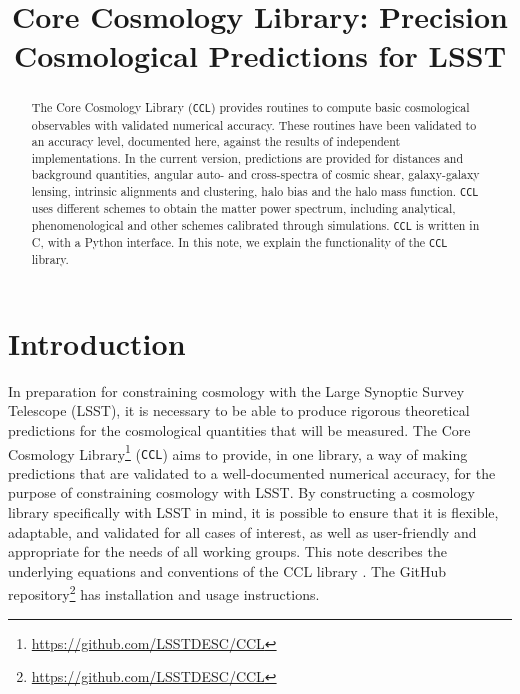 \documentclass[\docopts]{\docclass}
\newcommand{\ccl}{{\tt CCL}\xspace}
\begin{document}
\title{Core Cosmology Library: Precision Cosmological Predictions for LSST}

\maketitlepre

\begin{abstract}

The Core Cosmology Library (\ccl) provides routines to compute basic
cosmological observables with validated numerical accuracy. These routines have
been validated to an accuracy level, documented here, against the results of
independent implementations. In the current version, predictions are provided
for distances and background quantities, angular auto- and cross-spectra of
cosmic shear, galaxy-galaxy lensing, intrinsic alignments and clustering, halo
bias and the halo mass function. \ccl uses different schemes to obtain the
matter power spectrum, including analytical, phenomenological and other schemes
calibrated through simulations. \ccl is written in C, with a Python interface.
In this note, we explain the functionality of the \ccl library.

\end{abstract}


\maketitlepost

\newpage
\tableofcontents{}
\newpage

\section{Introduction}
\label{sec:intro}

In preparation for constraining cosmology with the Large Synoptic Survey
Telescope (LSST), it is necessary to be able to produce rigorous theoretical
predictions for the cosmological quantities that will be measured. The Core
Cosmology Library\footnote{\url{https://github.com/LSSTDESC/CCL}} (\ccl) aims to
provide, in one library, a way of making predictions that are validated to a
well-documented numerical accuracy, for the purpose of constraining cosmology
with LSST. By constructing a cosmology library specifically with LSST in mind,
it is possible to ensure that it is flexible, adaptable, and validated for all
cases of interest, as well as user-friendly and appropriate for the needs of all
working groups. This note describes the underlying equations and conventions
of the CCL library \citep[see also the CCL paper,][]{Chisari2019}.
The GitHub repository\footnote{\url{https://github.com/LSSTDESC/CCL}} has
installation and usage instructions.
\end{document}
